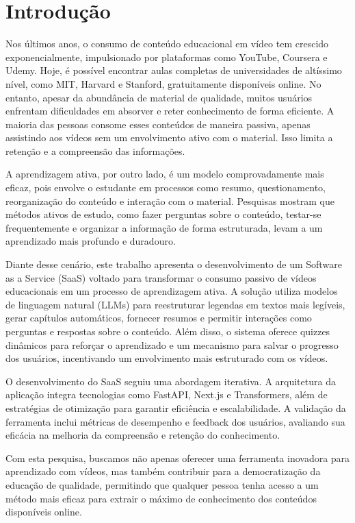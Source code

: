 \documentclass[tcc,capa]{texufpel}
\begin{document}
\tableofcontents

\chapter{Introdução}
Nos últimos anos, o consumo de conteúdo educacional em vídeo tem crescido exponencialmente, impulsionado por plataformas como YouTube, Coursera e Udemy. Hoje, é possível encontrar aulas completas de universidades de altíssimo nível, como MIT, Harvard e Stanford, gratuitamente disponíveis online. No entanto, apesar da abundância de material de qualidade, muitos usuários enfrentam dificuldades em absorver e reter conhecimento de forma eficiente. A maioria das pessoas consome esses conteúdos de maneira passiva, apenas assistindo aos vídeos sem um envolvimento ativo com o material. Isso limita a retenção e a compreensão das informações.

A aprendizagem ativa, por outro lado, é um modelo comprovadamente mais eficaz, pois envolve o estudante em processos como resumo, questionamento, reorganização do conteúdo e interação com o material. Pesquisas mostram que métodos ativos de estudo, como fazer perguntas sobre o conteúdo, testar-se frequentemente e organizar a informação de forma estruturada, levam a um aprendizado mais profundo e duradouro. 

Diante desse cenário, este trabalho apresenta o desenvolvimento de um Software as a Service (SaaS) voltado para transformar o consumo passivo de vídeos educacionais em um processo de aprendizagem ativa. A solução utiliza modelos de linguagem natural (LLMs) para reestruturar legendas em textos mais legíveis, gerar capítulos automáticos, fornecer resumos e permitir interações como perguntas e respostas sobre o conteúdo. Além disso, o sistema oferece quizzes dinâmicos para reforçar o aprendizado e um mecanismo para salvar o progresso dos usuários, incentivando um envolvimento mais estruturado com os vídeos.

O desenvolvimento do SaaS seguiu uma abordagem iterativa. A arquitetura da aplicação integra tecnologias como FastAPI, Next.js e Transformers, além de estratégias de otimização para garantir eficiência e escalabilidade. A validação da ferramenta inclui métricas de desempenho e feedback dos usuários, avaliando sua eficácia na melhoria da compreensão e retenção do conhecimento.

Com esta pesquisa, buscamos não apenas oferecer uma ferramenta inovadora para aprendizado com vídeos, mas também contribuir para a democratização da educação de qualidade, permitindo que qualquer pessoa tenha acesso a um método mais eficaz para extrair o máximo de conhecimento dos conteúdos disponíveis online.
\end{document}
